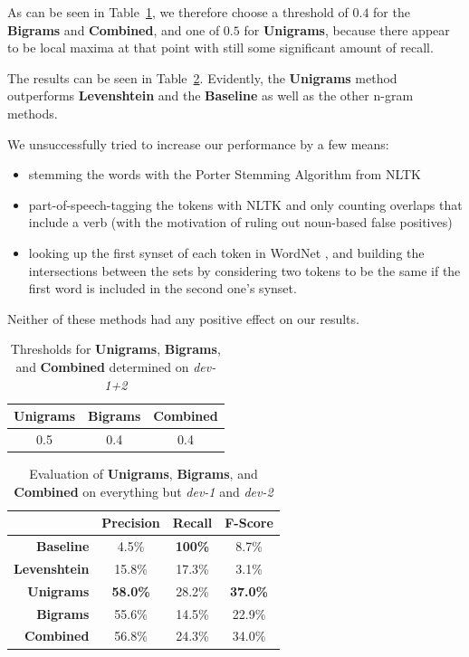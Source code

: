 \documentclass[a4paper,10pt]{scrartcl}
\theoremstyle{style}
\begin{document}
As can be seen in Table~\ref{thresholds}, we therefore choose a threshold of $0.4$ for the \textbf{Bigrams} and \textbf{Combined}, and one of $0.5$ for \textbf{Unigrams}, because there appear to be local maxima at that point with still some significant amount of recall.

The results can be seen in Table~\ref{eval_redundancy}. Evidently, the \textbf{Unigrams} method outperforms \textbf{Levenshtein} and the \textbf{Baseline} as well as the other n-gram methods.

We unsuccessfully tried to increase our performance by a few means:

\begin{itemize}
\item stemming the words with the Porter Stemming Algorithm \citep{porter1980algorithm} from NLTK \citep{bird2009natural}
\item part-of-speech-tagging the tokens with NLTK and only counting overlaps that include a verb (with the motivation of ruling out noun-based false positives)
\item looking up the first synset of each token in WordNet \citep{fellbaum2005wordnet}, and building the intersections between the sets by considering two tokens to be the same if the first word is included in the second one's synset.
\end{itemize}

Neither of these methods had any positive effect on our results.

\begin{table}
\begin{center}
\begin{tabular}{|c|c|c|}
\textbf{Unigrams} & \textbf{Bigrams} & \textbf{Combined} \\
\hline
0.5 & 0.4 & 0.4
\end{tabular}
\end{center}
\caption{Thresholds for \textbf{Unigrams}, \textbf{Bigrams}, and \textbf{Combined} determined on \textit{dev-1+2}}
\label{thresholds}
\end{table}

\begin{table}
\begin{center}
\begin{tabular}{|r|c|c|c|}
\hline
& Precision & Recall & F-Score \\
\hline
\textbf{Baseline} & 4.5\% & \textbf{100\%} & 8.7\% \\
\hline
\textbf{Levenshtein} & 15.8\% & 17.3\% & 3.1\% \\
\hline
\textbf{Unigrams} & \textbf{58.0\%} & 28.2\% & \textbf{37.0\%} \\
\hline
\textbf{Bigrams} & 55.6\% & 14.5\% & 22.9\% \\
\hline
\textbf{Combined} & 56.8\% & 24.3\% & 34.0\% \\
\hline
\end{tabular}
\end{center}
\caption{Evaluation of \textbf{Unigrams}, \textbf{Bigrams}, and \textbf{Combined} on everything but \textit{dev-1} and \textit{dev-2}}
\label{eval_redundancy}
\end{table}
\end{document}
